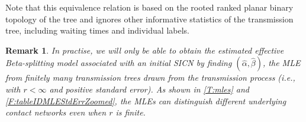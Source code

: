 \documentclass[review]{elsarticle}
\numberwithin{equation}{section}
\let\orgautoref\autoref
\renewcommand{\autoref}
        {\def\equationautorefname{Eq.}%
         \def\figureautorefname{Fig.}%
         \def\subfigureautorefname{Fig.}%
         \def\sectionautorefname{Sect.}%
         \def\subsectionautorefname{Sect.}%
         \def\subsubsectionautorefname{Sect.}%
         \def\Itemautorefname{item}%
         \def\tableautorefname{Table}%
         \def\propositionautorefname{Prop.}%
         \def\corollaryautorefname{Corollary}%
         \def\theoremautorefname{Theorem}%
         \def\remarkautorefname{Remark}%
         \def\lemmaautorefname{Lemma}%
         \def\proofofautorefname{Proof}%
         \def\exampleautorefname{Example}%
         \orgautoref}
\newtheorem{remark}{Remark}%
\begin{document}
Note that this equivalence relation is based on the rooted ranked planar binary topology of the tree and ignores other informative statistics of the transmission tree, including waiting times and individual labels.  

\begin{remark}\label{R:practicalMLE}
In practise, we will only be able to obtain the estimated effective Beta-splitting model associated with an initial SICN by finding $(\widehat{\alpha},\widehat{\beta})$, the MLE from finitely many transmission trees drawn from the transmission process (i.e., with $r < \infty$ and positive standard error).  
As shown in \autoref{T:mles} and \autoref{F:tableIDMLEStdErrZoomed}, the MLEs can distinguish different underlying contact networks even when $r$ is finite.  
\end{remark}
\end{document}
